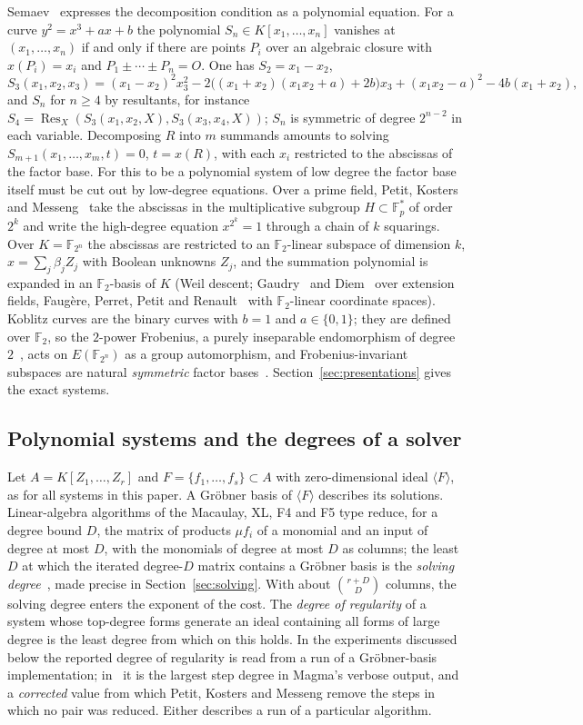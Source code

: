 \documentclass[11pt]{article}
\theoremstyle{definition}\newtheorem{definition}[theorem]{Definition}
\theoremstyle{remark}\newtheorem{remark}[theorem]{Remark}
\newcommand{\F}{\mathbb F}
\newcommand{\Id}{\langle F\rangle}
\begin{document}
Semaev~\cite{semaev} expresses the decomposition condition as a polynomial equation. For a curve
$y^2=x^3+ax+b$ the polynomial $S_n\in K[x_1,\ldots,x_n]$ vanishes at
$(x_1,\ldots,x_n)$ if and only if there are points $P_i$ over an algebraic
closure with $x(P_i)=x_i$ and $P_1\pm\cdots\pm P_n=O$. One has $S_2=x_1-x_2$,
\[
 S_3(x_1,x_2,x_3)=(x_1-x_2)^2x_3^2-2\bigl((x_1+x_2)(x_1x_2+a)+2b\bigr)x_3
 +(x_1x_2-a)^2-4b(x_1+x_2),
\]
and $S_{n}$ for $n\ge4$ by resultants, for instance
$S_4=\operatorname{Res}_X(S_3(x_1,x_2,X),S_3(x_3,x_4,X))$; $S_n$ is
symmetric of degree $2^{n-2}$ in each variable. Decomposing $R$ into $m$
summands amounts to solving $S_{m+1}(x_1,\ldots,x_m,t)=0$, $t=x(R)$, with
each $x_i$ restricted to the abscissas of the factor base. For this to be a
polynomial system of low degree the factor base itself must be cut out by
low-degree equations. Over a prime field, Petit, Kosters and
Messeng~\cite{pkm} take the abscissas in the multiplicative subgroup
$H\subset\F_p^*$ of order $2^k$ and write the high-degree equation
$x^{2^k}=1$ through a chain of $k$ squarings. Over $K=\F_{2^n}$ the
abscissas are restricted to an $\F_2$-linear subspace of dimension $k$,
$x=\sum_j\beta_jZ_j$ with Boolean unknowns $Z_j$, and the summation
polynomial is expanded in an $\F_2$-basis of $K$ (Weil descent; Gaudry~\cite{gaudry09}
and Diem~\cite{diem11} over extension fields, Faug\`ere, Perret, Petit and
Renault~\cite{fppr} with $\F_2$-linear coordinate spaces). Koblitz curves are
the binary curves with $b=1$ and $a\in\{0,1\}$; they are defined over $\F_2$,
so the $2$-power Frobenius, a purely inseparable endomorphism of
degree~$2$~\cite[Ch.~II, \S2]{silv}, acts on $E(\F_{2^n})$ as a group
automorphism, and Frobenius-invariant subspaces are natural
\emph{symmetric} factor bases~\cite{fghr14,ggmp21}.
Section~\ref{sec:presentations} gives the exact systems.

\subsection{Polynomial systems and the degrees of a solver}\label{sec:gb}
Let $A=K[Z_1,\ldots,Z_r]$ and $F=\{f_1,\ldots,f_s\}\subset A$ with
zero-dimensional ideal $\Id$, as for all systems in this paper. A Gr\"obner
basis of $\Id$ describes its solutions. Linear-algebra algorithms of the
Macaulay, XL, F4 and F5 type reduce, for a degree bound $D$, the matrix of
products $\mu f_i$ of a monomial and an input of degree at most $D$, with
the monomials of degree at most $D$ as columns; the least $D$ at which
the iterated degree-$D$ matrix contains a Gr\"obner basis is the
\emph{solving degree}~\cite[Def.~1.1]{cg}, made precise in
Section~\ref{sec:solving}. With about
$\binom{r+D}{D}$ columns, the solving degree enters the exponent of the
cost. The \emph{degree of regularity} of a system whose top-degree
forms generate an ideal containing all forms of large degree is the least
degree from which on this holds. In the experiments discussed below the
reported degree of regularity is read from a run of a Gr\"obner-basis
implementation; in~\cite{pkm} it is the largest step degree in Magma's
verbose output, and a \emph{corrected} value from which Petit, Kosters and
Messeng remove the steps in which no pair was reduced. Either describes a
run of a particular algorithm.
\end{document}
